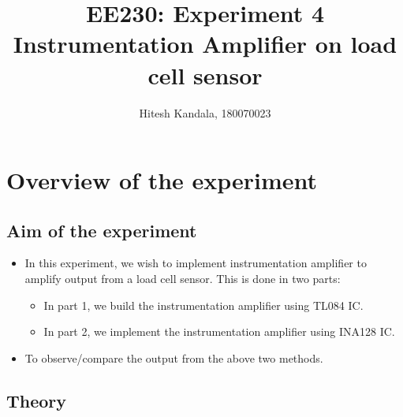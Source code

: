 \documentclass[12pt]{article}
\title{EE230: Experiment 4\\
Instrumentation Amplifier on load cell sensor}
\author{Hitesh Kandala, 180070023}
\begin{document}
\maketitle

\section{Overview of the experiment}

    \subsection{Aim of the experiment}
        \begin{itemize}
            \item In this experiment, we wish to implement instrumentation amplifier to amplify output from a load cell sensor. This is done in two parts:
            \begin{itemize}
                \item In part 1, we build the instrumentation amplifier using TL084 IC.
                \item In part 2, we implement the instrumentation amplifier using INA128 IC.
            \end{itemize}
            \item To observe/compare the output from the above two methods.
        \end{itemize}

    \subsection{Theory}
\end{document}
